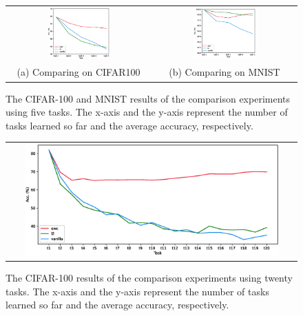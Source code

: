 \documentclass[final]{cvpr}
\begin{document}
\begin{figure}[b]
    \centering
	\begin{tabular}{c@{\hskip0.5cm}c}
		\includegraphics[width=0.45\textwidth]{resources/comp_CIFAR.eps}&%
        \includegraphics[width=0.45\textwidth]{resources/comp_MNIST.eps}\\%
        (a) Comparing on CIFAR100 & (b) Comparing on MNIST\\
	\end{tabular}\vspace{0.2cm}
	\caption{The CIFAR-100 and MNIST results of the comparison experiments using five tasks. The x-axis and the y-axis represent the number of tasks learned so far and the average accuracy, respectively.}
	\label{comp}
\end{figure}

\begin{figure}[t]
    \centering
	\begin{tabular}{c}
		\includegraphics[width=0.9\textwidth]{resources/comp_cifar20.eps}\\
	\end{tabular}\vspace{0.2cm}
	\caption{The CIFAR-100 results of the comparison experiments using twenty tasks. The x-axis and the y-axis represent the number of tasks learned so far and the average accuracy, respectively.}
	\label{comp2}
\end{figure}
\end{document}
